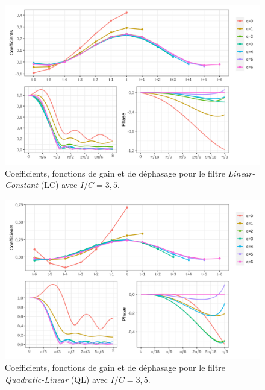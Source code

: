 \documentclass[
  12pt,
  a4paper,french]{article}
\newcommand\1{\mathds{1}}
\begin{document}
\begin{figure}[H]

{\centering \includegraphics[width=1\linewidth]{img/filters_used/lc} 

}

\caption[Coefficients, fonctions de gain et de déphasage pour le filtre \emph{Linear-Constant} (LC) avec \(I/C=3,5\)]{Coefficients, fonctions de gain et de déphasage pour le filtre \emph{Linear-Constant} (LC) avec \(I/C=3,5\).}\label{fig:graphslc}

\footnotesize
\normalsize\end{figure}

\begin{figure}[H]

{\centering \includegraphics[width=1\linewidth]{img/filters_used/ql} 

}

\caption[Coefficients, fonctions de gain et de déphasage pour le filtre \emph{Quadratic-Linear} (QL) avec \(I/C=3,5\)]{Coefficients, fonctions de gain et de déphasage pour le filtre \emph{Quadratic-Linear} (QL) avec \(I/C=3,5\).}\label{fig:graphsql}

\footnotesize
\normalsize\end{figure}
\end{document}
